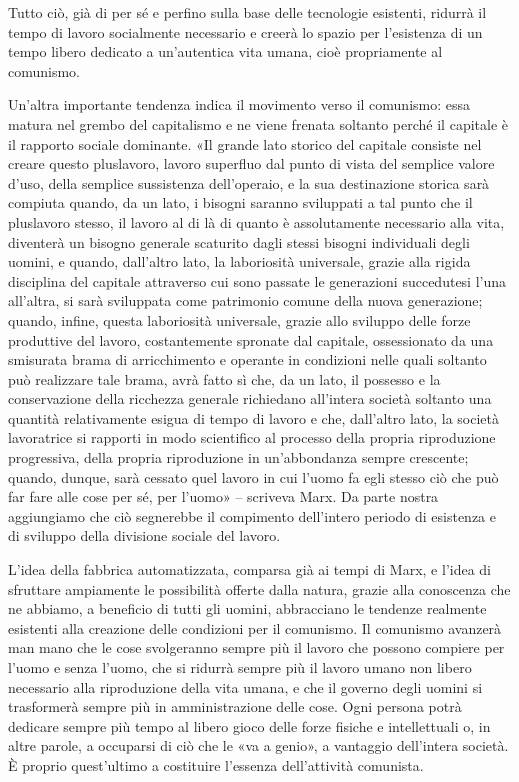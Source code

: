 \documentclass[12pt,a4paper,openany]{book}
\begin{document}
Tutto ciò, già di per sé e perfino sulla base delle tecnologie esistenti, ridurrà il tempo di lavoro socialmente necessario e creerà lo spazio per l'esistenza di un tempo libero dedicato a un'autentica vita umana, cioè propriamente al comunismo.

Un'altra importante tendenza indica il movimento verso il comunismo: essa matura nel grembo del capitalismo e ne viene frenata soltanto perché il capitale è il rapporto sociale dominante. «Il grande lato storico del capitale consiste nel creare questo pluslavoro, lavoro superfluo dal punto di vista del semplice valore d'uso, della semplice sussistenza dell'operaio, e la sua destinazione storica sarà compiuta quando, da un lato, i bisogni saranno sviluppati a tal punto che il pluslavoro stesso, il lavoro al di là di quanto è assolutamente necessario alla vita, diventerà un bisogno generale scaturito dagli stessi bisogni individuali degli uomini, e quando, dall'altro lato, la laboriosità universale, grazie alla rigida disciplina del capitale attraverso cui sono passate le generazioni succedutesi l'una all'altra, si sarà sviluppata come patrimonio comune della nuova generazione; quando, infine, questa laboriosità universale, grazie allo sviluppo delle forze produttive del lavoro, costantemente spronate dal capitale, ossessionato da una smisurata brama di arricchimento e operante in condizioni nelle quali soltanto può realizzare tale brama, avrà fatto sì che, da un lato, il possesso e la conservazione della ricchezza generale richiedano all'intera società soltanto una quantità relativamente esigua di tempo di lavoro e che, dall'altro lato, la società lavoratrice si rapporti in modo scientifico al processo della propria riproduzione progressiva, della propria riproduzione in un'abbondanza sempre crescente; quando, dunque, sarà cessato quel lavoro in cui l'uomo fa egli stesso ciò che può far fare alle cose per sé, per l'uomo» – scriveva Marx. Da parte nostra aggiungiamo che ciò segnerebbe il compimento dell'intero periodo di esistenza e di sviluppo della divisione sociale del lavoro.

L'idea della fabbrica automatizzata, comparsa già ai tempi di Marx, e l'idea di sfruttare ampiamente le possibilità offerte dalla natura, grazie alla conoscenza che ne abbiamo, a beneficio di tutti gli uomini, abbracciano le tendenze realmente esistenti alla creazione delle condizioni per il comunismo. Il comunismo avanzerà man mano che le cose svolgeranno sempre più il lavoro che possono compiere per l'uomo e senza l'uomo, che si ridurrà sempre più il lavoro umano non libero necessario alla riproduzione della vita umana, e che il governo degli uomini si trasformerà sempre più in amministrazione delle cose. Ogni persona potrà dedicare sempre più tempo al libero gioco delle forze fisiche e intellettuali o, in altre parole, a occuparsi di ciò che le «va a genio», a vantaggio dell'intera società. È proprio quest'ultimo a costituire l'essenza dell'attività comunista.
\end{document}
